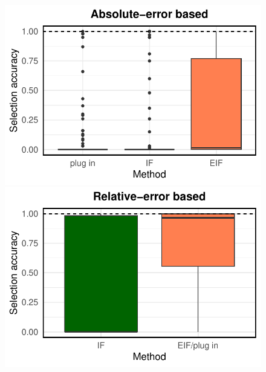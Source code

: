 \documentclass{article}
\theoremstyle{plain}
\theoremstyle{definition}
\theoremstyle{plain}
\begin{document}
\begin{figure}[h]
\begin{minipage}{0.3\textwidth}
                \centering
                \includegraphics[clip, trim = 0cm 0cm 0cm 0cm, width = \textwidth]{plot/ACIC_linear_propensity_nonlinear_HTE_selection_accuracy_absolute_error.pdf}
        \end{minipage}
            \begin{minipage}{0.3\textwidth}
                \centering
                \includegraphics[clip, trim = 0cm 0cm 0cm 0cm, width = \textwidth]{plot/ACIC_linear_propensity_nonlinear_HTE_selection_accuracy_relative_error.pdf}
        \end{minipage}
                \begin{minipage}{0.3\textwidth}
                \centering

\end{minipage}
\end{figure}
\end{document}
